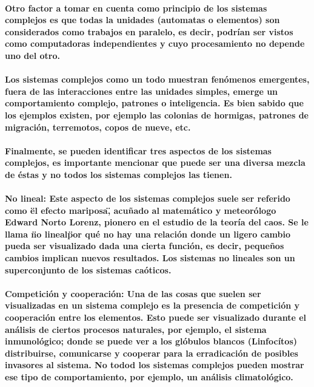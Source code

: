       \paragraph{Otro factor a tomar en cuenta como principio de los sistemas complejos es que todas la unidades (automatas o elementos) son considerados como trabajos en paralelo, es decir, podrían ser vistos como computadoras independientes y cuyo procesamiento no depende uno del otro.}
      \paragraph{Los sistemas complejos como un todo muestran fenómenos emergentes, fuera de las interacciones entre las unidades simples, emerge un comportamiento complejo, patrones o inteligencia. Es bien sabido que los ejemplos existen, por ejemplo las colonias de hormigas, patrones de migración, terremotos, copos de nueve, etc.}
      \paragraph{Finalmente, se pueden identificar tres aspectos de los sistemas complejos, es importante mencionar que puede ser una diversa mezcla de éstas y no todos los sistemas complejos las tienen.}
      \paragraph{\textbf{No lineal}: Este aspecto de los sistemas complejos suele ser referido como \"el efecto mariposa\", acuñado al matemático y meteorólogo Edward Norto Lorenz, pionero en el estudio de la teoría del caos. Se le llama \"no lineal\" por qué no hay una relación donde un ligero cambio pueda ser visualizado dada una cierta función, es decir, pequeños cambios implican nuevos resultados. Los sistemas no lineales son un superconjunto de los sistemas caóticos.}
      \paragraph{\textbf{Competición y cooperación}: Una de las cosas que suelen ser visualizadas en un sistema complejo es la presencia de competición y cooperación entre los elementos. Esto puede ser visualizado durante el análisis de ciertos procesos naturales, por ejemplo, el sistema inmunológico; donde se puede ver a los glóbulos blancos (Linfocítos) distribuirse, comunicarse y cooperar para la erradicación de posibles invasores al sistema. No todod los sistemas complejos pueden mostrar ese tipo de comportamiento, por ejemplo, un análisis climatológico.}

